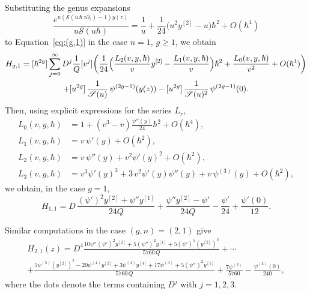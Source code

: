 \documentclass[11pt]{article}
\let\mathcal\mathscr
\theoremstyle{plain}
\theoremstyle{definition}
\theoremstyle{remark}
\newcommand{\cS}{\mathcal{S}}
\begin{document}
Substituting the genus expansions
\begin{equation}\label{eq:V-exp}
\frac{e^{u(\cS(u\,\hbar\, z\partial_{z})-1)y(z)}}{u\cS(u\hbar)}
=\frac{1}{u}+\frac{1}{24} \bigl(u^2 y^{[2]}-u \bigr)\hbar ^2 +O(\hbar^4)
\end{equation}
to Equation~\eqref{eq:(g,1)} in the case $n=1$, $g\ge1$, we obtain
\begin{multline*}
H_{g,1} =[\hbar^{2g}]\sum_{j=0}^\infty D^j \frac{1}{Q}[v^j]
\biggl(\frac1{24} \Bigl(\frac{L_2(v,y,\hbar)}{v}y^{[2]}-\frac{L_1(v,y,\hbar)}{v} \Bigr)\hbar^2
+\frac{L_0(v,y,\hbar)}{v^2}+O(\hbar^4) \biggr)
\\
+[u^{2g}]\,\frac1{\cS(u)}\, \psi^{(2g-1)}(y(z))
-[u^{2g}]\,\frac1{\cS(u)^2}\, \psi^{(2g-1)}(0).
\end{multline*}
Then, using explicit expressions for the series $L_r$,
\begin{equation}\label{eq:L-exp}
\begin{aligned}
L_0(v,y,\hbar)&=1+(v^3- v)\frac{\psi ''(y)}{24} \hbar ^2+O(\hbar^4),\\
L_1(v,y,\hbar)&=v\,\psi'(y)+O(\hbar^2),\\
L_2(v,y,\hbar)&=v\,\psi ''(y)+v^2 \psi '(y)^2+O(\hbar^2),\\
L_3(v,y,\hbar)&=v^3 \psi '(y)^3+3\,v^2 \psi '(y) \psi ''(y)+v\,\psi ^{(3)}(y)+O(\hbar^2),
\end{aligned}
\end{equation}
we obtain, in the case $g=1$,
\begin{equation*}
H_{1,1}
=D\,\frac{\left(\psi'\right)^2 y^{[2]}+\psi''y^{[1]}}{24Q}+
\frac{\psi'' y^{[2]}-\psi'}{24Q}-\frac{\psi'}{24}+\frac{\psi'(0)}{12}.
\end{equation*}

Similar computations in the case $(g,n)=(2,1)$ give
\begin{multline*}
H_{2,1}(z) =D^4\frac{10 \psi'' \left(\psi'\right)^2 y^{[2]}+5 \left(\psi''\right)^2 y^{[1]}+5 \left(\psi'\right)^5 \left(y^{[2]}\right)^2}{5760\,Q}
+\cdots\\
+\frac{5 \psi^{(5)} \left(y^{[2]}\right)^2-20 \psi^{(4)} y^{[2]}+3 \psi^{(4)} y^{[4]}+17 \psi^{(3)}+5 \left(\psi''\right)^2 y^{[1]}}{5760\,Q}
+\frac{7\psi^{(3)}}{5760}-\frac{\psi ^{(3)}(0)}{240},
\end{multline*}
where the dots denote the terms containing $D^j$ with $j=1,2,3$.
\end{document}
